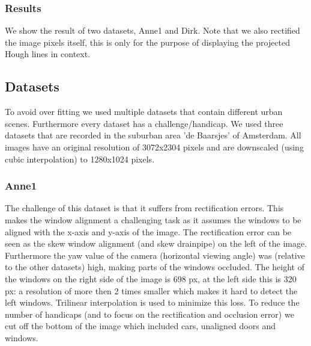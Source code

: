 \subsubsection{Results} %
We show the result of two datasets, Anne1 and Dirk.
Note that we also rectified the image pixels itself, this is only for
the purpose of displaying the projected Hough lines in context.

\newpage
{}
\clearpage

\newpage
{}




\subsection{Datasets}
To avoid over fitting we used multiple datasets that contain different urban
scenes.  Furthermore every dataset has a challenge/handicap.
We used three datasets that are recorded in the suburban area
'de Baarsjes' of Amsterdam.  All images have an original resolution of 3072x2304
pixels and are downscaled (using cubic interpolation) to 1280x1024 pixels.

\subsubsection{Anne1}
The challenge of this dataset is that it suffers from rectification errors.
This makes the window alignment a challenging task as it assumes the windows to
be aligned with the x-axis and y-axis of the image.
The rectification error can be seen as the skew window alignment (and skew
drainpipe) on the left of the image. 
Furthermore the yaw value of the camera (horizontal viewing angle) was (relative
to the other datasets) high, making parts of the windows occluded.  The height
of the windows on the right side of the image is 698 px, at the left side this
is 320 px: a resolution of more then 2 times smaller which makes it hard to detect
the left windows. Trilinear interpolation is used to minimize this loss.
To reduce the number of handicaps (and to focus on the rectification and
occlusion error) we cut off the bottom of the image which included cars, unaligned doors and windows.
\clearpage

